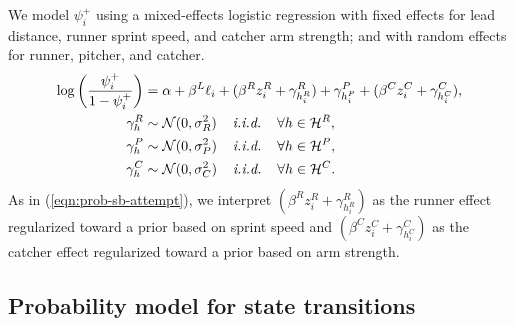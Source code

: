 \documentclass[11pt]{article}
\begin{document}
        We model $\psi_i^+$ using a mixed-effects logistic regression with fixed effects for lead distance, runner sprint speed, and catcher arm strength; and with random effects for runner, pitcher, and catcher.
        \begin{align}
          \label{eqn:prob-sb-success}
          \begin{split}
            \log\left(\frac{\psi_i^+}{1 - \psi_i^+}\right) &= \alpha + \beta^L \ell_i + (\beta^R z_i^R + \gamma^R_{h_i^R}) + \gamma^P_{h_i^P} + (\beta^C z_i^C + \gamma^C_{h_i^C}),\\
            \gamma^R_{h} &\sim \mathcal{N}(0, \sigma^2_R) \hspace{4mm} \mbox{\it i.i.d.} \hspace{4mm} \forall h \in \mathcal{H}^R,\\
            \gamma^P_{h} &\sim \mathcal{N}(0, \sigma^2_P) \hspace{4mm} \mbox{\it i.i.d.} \hspace{4mm} \forall h \in \mathcal{H}^P,\\
            \gamma^C_{h} &\sim \mathcal{N}(0, \sigma^2_C) \hspace{4mm} \mbox{\it i.i.d.} \hspace{4mm} \forall h \in \mathcal{H}^C.
          \end{split}
        \end{align}
        As in (\ref{eqn:prob-sb-attempt}), we interpret $(\beta^R z_i^R + \gamma^R_{h_i^R})$ as the runner effect regularized toward a prior based on sprint speed and $(\beta^C z_i^C + \gamma^C_{h_i^C})$ as the catcher effect regularized toward a prior based on arm strength.

    \subsection{Probability model for state transitions}
    \label{sec:prob-state-transition}
\end{document}
